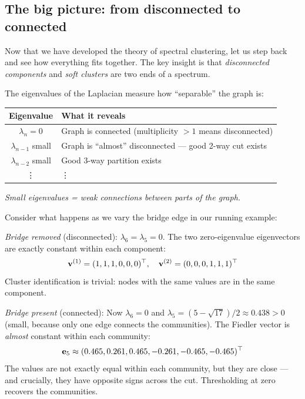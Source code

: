 \begin{notechapter}
\subsection{The big picture: from disconnected to connected}

Now that we have developed the theory of spectral clustering, let us step back and see how everything fits together. The key insight is that \emph{disconnected components} and \emph{soft clusters} are two ends of a spectrum.

\begin{keyidea}
The eigenvalues of the Laplacian measure how ``separable'' the graph is:

\begin{center}
\begin{tabular}{cl}
\toprule
Eigenvalue & What it reveals \\
\midrule
$\lambda_n = 0$ & Graph is connected (multiplicity $>1$ means disconnected) \\
$\lambda_{n-1}$ small & Graph is ``almost'' disconnected --- good 2-way cut exists \\
$\lambda_{n-2}$ small & Good 3-way partition exists \\
\vdots & \vdots \\
\bottomrule
\end{tabular}
\end{center}

\emph{Small eigenvalues = weak connections between parts of the graph.}
\end{keyidea}

\begin{intuition}
Consider what happens as we vary the bridge edge in our running example:

\emph{Bridge removed} (disconnected): $\lambda_6 = \lambda_5 = 0$. The two zero-eigenvalue eigenvectors are exactly constant within each component:
\[
\mathbf{v}^{(1)} = (1,1,1,0,0,0)^\top, \quad \mathbf{v}^{(2)} = (0,0,0,1,1,1)^\top
\]
Cluster identification is trivial: nodes with the same values are in the same component.

\emph{Bridge present} (connected): Now $\lambda_6 = 0$ and $\lambda_5 = (5 - \sqrt{17})/2\approx0.438 > 0$ (small, because only one edge connects the communities). The Fiedler vector is \emph{almost} constant within each community:
\[
\mathbf{e}_5 \approx (0.465, 0.261, 0.465, -0.261, -0.465, -0.465)^\top
\]
The values are not exactly equal within each community, but they are close --- and crucially, they have opposite signs across the cut. Thresholding at zero recovers the communities.


\end{intuition}
\end{notechapter}
